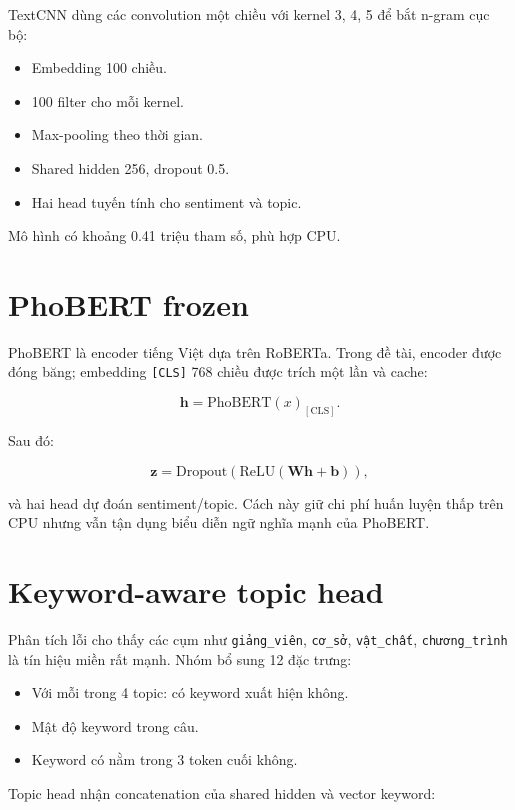 \documentclass[12pt,a4paper]{report}
\begin{document}
TextCNN \cite{textcnn} dùng các convolution một chiều với kernel 3, 4, 5 để bắt n-gram cục bộ:

\begin{itemize}[leftmargin=1.2cm]
  \item Embedding 100 chiều.
  \item 100 filter cho mỗi kernel.
  \item Max-pooling theo thời gian.
  \item Shared hidden 256, dropout 0.5.
  \item Hai head tuyến tính cho sentiment và topic.
\end{itemize}

Mô hình có khoảng 0.41 triệu tham số, phù hợp CPU.

\section{PhoBERT frozen}

PhoBERT \cite{phobert} là encoder tiếng Việt dựa trên RoBERTa. Trong đề tài, encoder được đóng băng; embedding \texttt{[CLS]} 768 chiều được trích một lần và cache:

\[
\mathbf{h} = \text{PhoBERT}(x)_{[\text{CLS}]}.
\]

Sau đó:

\[
\mathbf{z} = \mathrm{Dropout}(\mathrm{ReLU}(\mathbf{W}\mathbf{h} + \mathbf{b})),
\]

và hai head dự đoán sentiment/topic. Cách này giữ chi phí huấn luyện thấp trên CPU nhưng vẫn tận dụng biểu diễn ngữ nghĩa mạnh của PhoBERT.

\section{Keyword-aware topic head}

Phân tích lỗi cho thấy các cụm như \texttt{giảng\_viên}, \texttt{cơ\_sở}, \texttt{vật\_chất}, \texttt{chương\_trình} là tín hiệu miền rất mạnh. Nhóm bổ sung 12 đặc trưng:

\begin{itemize}[leftmargin=1.2cm]
  \item Với mỗi trong 4 topic: có keyword xuất hiện không.
  \item Mật độ keyword trong câu.
  \item Keyword có nằm trong 3 token cuối không.
\end{itemize}

Topic head nhận concatenation của shared hidden và vector keyword:
\end{document}
